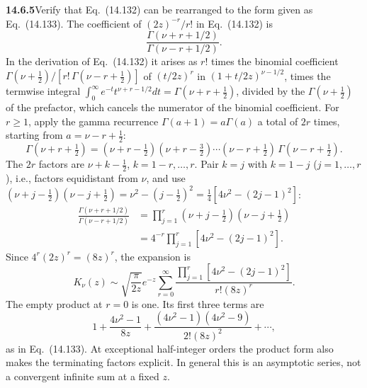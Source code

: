 \par\bigskip
\noindent\textbf{14.6.5}\quad Verify that Eq.~(14.132) can be
rearranged to the form given as Eq.~(14.133).
\solution
The coefficient of $(2z)^{-r}/r!$ in Eq.~(14.132) is
\[
\frac{\Gamma(\nu+r+1/2)}{\Gamma(\nu-r+1/2)}.
\]
In the derivation of Eq.~(14.132) it arises as $r!$ times the
binomial coefficient $\Gamma(\nu+\frac12)/[r!\,\Gamma(\nu-r+\frac12)]$
of $(t/2z)^r$ in $(1+t/2z)^{\nu-1/2}$, times the termwise integral
$\int_0^\infty e^{-t}t^{\nu+r-1/2}dt=\Gamma(\nu+r+\frac12)$,
divided by the $\Gamma(\nu+\frac12)$ of the prefactor, which
cancels the numerator of the binomial coefficient.
For $r\ge1$, apply the gamma recurrence $\Gamma(a+1)=a\Gamma(a)$
a total of $2r$ times, starting from $a=\nu-r+\frac12$:
\[
\Gamma(\nu+r+\tfrac12)
=(\nu+r-\tfrac12)(\nu+r-\tfrac32)\cdots(\nu-r+\tfrac12)\,
\Gamma(\nu-r+\tfrac12).
\]
The $2r$ factors are $\nu+k-\frac12$, $k=1-r,\dots,r$. Pair
$k=j$ with $k=1-j$ ($j=1,\dots,r$), i.e., factors equidistant from
$\nu$, and use
$(\nu+j-\frac12)(\nu-j+\frac12)=\nu^2-(j-\frac12)^2
=\frac14[4\nu^2-(2j-1)^2]$:
\begin{align*}
\frac{\Gamma(\nu+r+1/2)}{\Gamma(\nu-r+1/2)}
&=\prod_{j=1}^r
\left(\nu+j-\tfrac12\right)
\left(\nu-j+\tfrac12\right)\\
&=4^{-r}\prod_{j=1}^r[4\nu^2-(2j-1)^2].
\end{align*}
Since $4^r(2z)^r=(8z)^r$, the expansion is
\[
\boxed{K_\nu(z)\sim\sqrt{\frac\pi{2z}}e^{-z}
\sum_{r=0}^\infty
\frac{\prod_{j=1}^r[4\nu^2-(2j-1)^2]}{r!(8z)^r}}.
\]
The empty product at $r=0$ is one. Its first three terms are
\[
1+\frac{4\nu^2-1}{8z}
+\frac{(4\nu^2-1)(4\nu^2-9)}{2!(8z)^2}+\cdots,
\]
as in Eq.~(14.133). At exceptional half-integer orders the
product form also makes the terminating factors explicit. In
general this is an asymptotic series, not a convergent infinite
sum at a fixed $z$.

